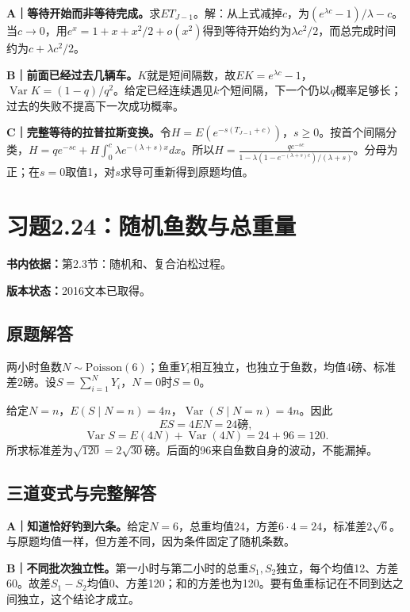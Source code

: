 \documentclass[
  11pt,
  a4paper,
  UTF8,fontset=fandol]{ctexart}
\let\OldSection\section
\renewcommand{\section}{\Needspace{7\baselineskip}\OldSection}
\let\OldSubsection\subsection
\renewcommand{\subsection}{\Needspace{5\baselineskip}\OldSubsection}
\begin{document}
\textbf{A｜等待开始而非等待完成。}求\(E T_{J-1}\)。解：从上式减掉\(c\)，为\((e^{\lambda c}-1)/\lambda-c\)。当\(c\to0\)，用\(e^x=1+x+x^2/2+o(x^2)\)得到等待开始约为\(\lambda c^2/2\)，而总完成时间约为\(c+\lambda c^2/2\)。

\textbf{B｜前面已经过去几辆车。}\(K\)就是短间隔数，故\(EK=e^{\lambda c}-1\)，\(\operatorname{Var}K=(1-q)/q^2\)。给定已经连续遇见\(k\)个短间隔，下一个仍以\(q\)概率足够长；过去的失败不提高下一次成功概率。

\textbf{C｜完整等待的拉普拉斯变换。}令\(H=E(e^{-s(T_{J-1}+c)})\)，\(s\ge0\)。按首个间隔分类，\(H=q e^{-sc}+H\int_0^c\lambda e^{-(\lambda+s)x}dx\)。所以\(H=\frac{q e^{-sc}}{1-\lambda(1-e^{-(\lambda+s)c})/(\lambda+s)}\)。分母为正；在\(s=0\)取值1，对\(s\)求导可重新得到原题均值。

\newpage

\section{习题2.24：随机鱼数与总重量}\label{ux4e60ux98982.24ux968fux673aux9c7cux6570ux4e0eux603bux91cdux91cf}

\textbf{书内依据：}第2.3节：随机和、复合泊松过程。

\textbf{版本状态：}2016文本已取得。

\subsection{原题解答}\label{ux539fux9898ux89e3ux7b54-23}

两小时鱼数\(N\sim\mathrm{Poisson}(6)\)；鱼重\(Y_i\)相互独立，也独立于鱼数，均值4磅、标准差2磅。设\(S=\sum_{i=1}^NY_i\)，\(N=0\)时\(S=0\)。

给定\(N=n\)，\(E(S\mid N=n)=4n\)，\(\operatorname{Var}(S\mid N=n)=4n\)。因此
\[ES=4EN=\boxed{24\text{磅}},\]
\[\operatorname{Var}S=E(4N)+\operatorname{Var}(4N)=24+96=120.\]
所求标准差为\(\boxed{\sqrt{120}=2\sqrt{30}\text{磅}}\)。后面的96来自鱼数自身的波动，不能漏掉。

\subsection{三道变式与完整解答}\label{ux4e09ux9053ux53d8ux5f0fux4e0eux5b8cux6574ux89e3ux7b54-23}

\textbf{A｜知道恰好钓到六条。}给定\(N=6\)，总重均值24，方差\(6\cdot4=24\)，标准差\(2\sqrt6\)。与原题均值一样，但方差不同，因为条件固定了随机条数。

\textbf{B｜不同批次独立性。}第一小时与第二小时的总重\(S_1,S_2\)独立，每个均值12、方差60。故差\(S_1-S_2\)均值0、方差120；和的方差也为120。要有鱼重标记在不同到达之间独立，这个结论才成立。
\end{document}
